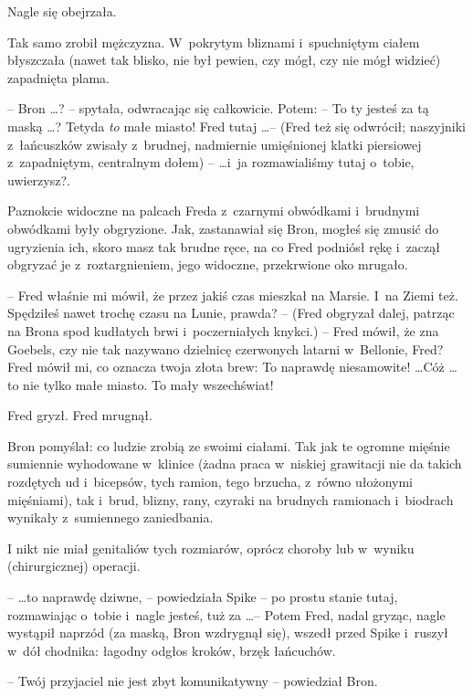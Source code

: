 \documentclass[oneside,polish,11pt,rmheadings]{mwbk}
\begin{document}
Nagle się obejrzała. 

Tak samo zrobił mężczyzna. W~pokrytym bliznami i~spuchniętym ciałem błyszczała (nawet tak blisko, nie był pewien, czy mógł, czy nie mógł widzieć) zapadnięta plama.

-- Bron \ldots ? -- spytała, odwracając się całkowicie. Potem: -- To ty jesteś za tą maską \ldots  ? Tetyda \textit{to }małe miasto! Fred tutaj \ldots  -- (Fred też się odwrócił; naszyjniki z~łańcuszków zwisały z~brudnej, nadmiernie umięśnionej klatki piersiowej z~zapadniętym, centralnym dołem) --  \ldots  i~ja rozmawialiśmy tutaj o~tobie, uwierzysz?. 

Paznokcie widoczne na palcach Freda z~czarnymi obwódkami i~brudnymi obwódkami były obgryzione. Jak, zastanawiał się Bron, mogłeś się zmusić do ugryzienia ich, skoro masz tak brudne ręce, na co Fred podniósł rękę i~zaczął obgryzać je z~roztargnieniem, jego widoczne, przekrwione oko mrugało. 

-- Fred właśnie mi mówił, że przez jakiś czas mieszkał na Marsie. I~na Ziemi też. Spędziłeś nawet trochę czasu na Lunie, prawda? -- (Fred obgryzał dalej, patrząc na Brona spod kudłatych brwi i~poczerniałych knykci.) -- Fred mówił, że zna Goebels, czy nie tak nazywano dzielnicę czerwonych latarni w~Bellonie, Fred? Fred mówił mi, co oznacza twoja złota brew: To naprawdę niesamowite! \ldots  Cóż \ldots  to nie tylko małe miasto. To mały wszechświat! 

Fred gryzł. Fred mrugnął. 

Bron pomyślał: co ludzie zrobią ze swoimi ciałami. Tak jak te ogromne mięśnie sumiennie wyhodowane w~klinice (żadna praca w~niskiej grawitacji nie da takich rozdętych ud i~bicepsów, tych ramion, tego brzucha, z~równo ułożonymi mięśniami), tak i~brud, blizny, rany, czyraki na brudnych ramionach i~biodrach wynikały z~sumiennego zaniedbania. 

I nikt nie miał genitaliów tych rozmiarów, oprócz choroby lub w~wyniku (chirurgicznej) operacji. 

--  \ldots to naprawdę dziwne, -- powiedziała Spike -- po prostu stanie tutaj, rozmawiając o~tobie i~nagle jesteś, tuż za \ldots  -- Potem Fred, nadal gryząc, nagle wystąpił naprzód (za maską, Bron wzdrygnął się), wszedł przed Spike i~ruszył w~dół chodnika: łagodny odgłos kroków, brzęk łańcuchów. 

-- Twój przyjaciel nie jest zbyt komunikatywny – powiedział Bron. 
\end{document}
